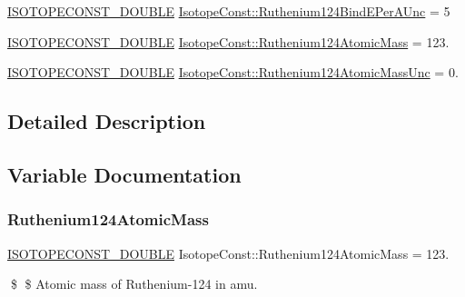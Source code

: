 \begin{DoxyCompactItemize}
\mbox{\hyperlink{group___isotope_const-_macros_ga8f45a7272ce02c0b4c65c44636ed719a}{I\+S\+O\+T\+O\+P\+E\+C\+O\+N\+S\+T\+\_\+\+D\+O\+U\+B\+LE}} \mbox{\hyperlink{group___isotope_const-_ruthenium-_ru124_gafdd79845f765dd604b3cb8d02c5814bf}{Isotope\+Const\+::\+Ruthenium124\+Bind\+E\+Per\+A\+Unc}} = 5
\item 
\mbox{\hyperlink{group___isotope_const-_macros_ga8f45a7272ce02c0b4c65c44636ed719a}{I\+S\+O\+T\+O\+P\+E\+C\+O\+N\+S\+T\+\_\+\+D\+O\+U\+B\+LE}} \mbox{\hyperlink{group___isotope_const-_ruthenium-_ru124_ga39ff55ee04cf8e3d172414c4d3fdd310}{Isotope\+Const\+::\+Ruthenium124\+Atomic\+Mass}} = 123.
\item 
\mbox{\hyperlink{group___isotope_const-_macros_ga8f45a7272ce02c0b4c65c44636ed719a}{I\+S\+O\+T\+O\+P\+E\+C\+O\+N\+S\+T\+\_\+\+D\+O\+U\+B\+LE}} \mbox{\hyperlink{group___isotope_const-_ruthenium-_ru124_ga52ac09f7bcc5e486f9286985ae01ed05}{Isotope\+Const\+::\+Ruthenium124\+Atomic\+Mass\+Unc}} = 0.
\end{DoxyCompactItemize}


\subsection{Detailed Description}


\subsection{Variable Documentation}
\mbox{\label{group___isotope_const-_ruthenium-_ru124_ga39ff55ee04cf8e3d172414c4d3fdd310}} 
\subsubsection{\texorpdfstring{Ruthenium124\+Atomic\+Mass}{Ruthenium124AtomicMass}}
{\footnotesize\ttfamily \mbox{\hyperlink{group___isotope_const-_macros_ga8f45a7272ce02c0b4c65c44636ed719a}{I\+S\+O\+T\+O\+P\+E\+C\+O\+N\+S\+T\+\_\+\+D\+O\+U\+B\+LE}} Isotope\+Const\+::\+Ruthenium124\+Atomic\+Mass = 123.}

\$ \$ Atomic mass of Ruthenium-\/124 in amu. \mbox{\label{group___isotope_const-_ruthenium-_ru124_ga52ac09f7bcc5e486f9286985ae01ed05}} 
